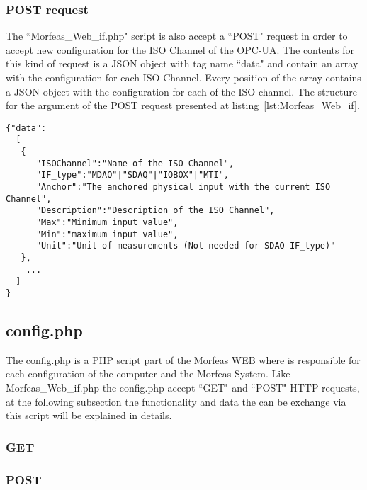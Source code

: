 \subsubsection{POST request}
The ``Morfeas\_Web\_if.php" script is also accept a ``POST" request in order to accept new configuration for the ISO Channel of the OPC-UA.
The contents for this kind of request is a JSON object with tag name ``data" and contain an array with the configuration for each ISO Channel.
Every position of the array contains a JSON object with the configuration for each of the ISO channel. The structure for the argument of the POST request
presented at listing~\ref{lst:Morfeas_Web_if}.

\begin{lstlisting}[frame=single,caption=Example for argument of POST request for Morfeas\_Web\_if.php,label=lst:Morfeas_Web_if]
{"data":
  [
   {
      "ISOChannel":"Name of the ISO Channel",
      "IF_type":"MDAQ"|"SDAQ"|"IOBOX"|"MTI",
      "Anchor":"The anchored physical input with the current ISO Channel",
      "Description":"Description of the ISO Channel",
      "Max":"Minimum input value",
      "Min":"maximum input value",
      "Unit":"Unit of measurements (Not needed for SDAQ IF_type)"
   },
    ...
  ]
}
\end{lstlisting}
\newpage
\subsection{config.php}
The config.php is a PHP script part of the Morfeas WEB where is responsible for each configuration of the computer and the Morfeas System. Like Morfeas\_Web\_if.php
the config.php accept ``GET" and ``POST" HTTP requests, at the following subsection the functionality and data the can be exchange via this script will be explained in details.

\subsubsection{GET}

\subsubsection{POST}
